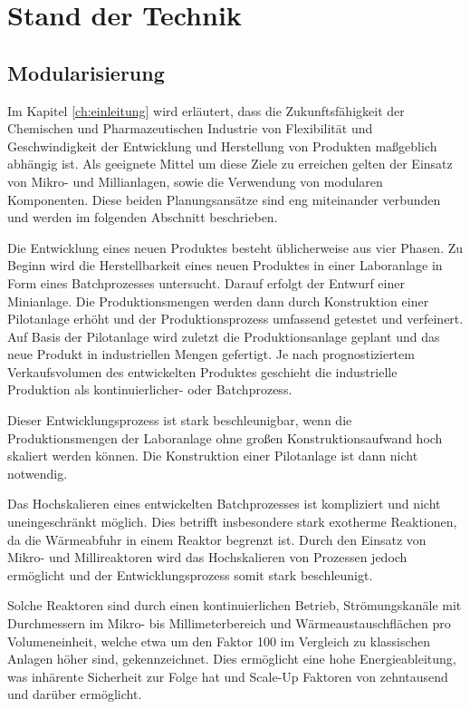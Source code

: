 \chapter{Stand der Technik} \label{ch:sdt}
\section{Modularisierung}
Im Kapitel \ref{ch:einleitung} wird erl\"autert, dass die Zukunftsf\"ahigkeit der Chemischen und Pharmazeutischen Industrie von Flexibilit\"at und Geschwindigkeit der Entwicklung und Herstellung von Produkten ma\ss{}geblich abh\"angig ist. Als geeignete Mittel um diese Ziele zu erreichen gelten der Einsatz von Mikro- und Millianlagen, sowie die Verwendung von modularen Komponenten. Diese beiden Planungsans\"atze sind eng miteinander verbunden und werden im folgenden Abschnitt beschrieben.  


Die Entwicklung eines neuen Produktes besteht \"ublicherweise aus vier Phasen. Zu Beginn wird die Herstellbarkeit eines neuen Produktes in einer Laboranlage in Form eines Batchprozesses untersucht. Darauf erfolgt der Entwurf einer Minianlage. Die Produktionsmengen werden dann durch Konstruktion einer Pilotanlage erh\"oht und der Produktionsprozess umfassend getestet und verfeinert. Auf Basis der Pilotanlage wird zuletzt die Produktionsanlage geplant und das neue Produkt in industriellen Mengen gefertigt. Je nach prognostiziertem Verkaufsvolumen des entwickelten Produktes geschieht die industrielle Produktion als kontinuierlicher- oder Batchprozess. \cite{Grundemann_2012}

Dieser  Entwicklungsprozess ist stark beschleunigbar, wenn die Produktionsmengen der Laboranlage ohne gro\ss{}en Konstruktionsaufwand hoch skaliert werden k\"onnen. Die Konstruktion einer Pilotanlage ist dann nicht notwendig.

Das Hochskalieren eines entwickelten Batchprozesses ist kompliziert und nicht uneingeschr\"ankt m\"oglich. Dies betrifft insbesondere stark exotherme Reaktionen, da die W\"armeabfuhr in einem Reaktor begrenzt ist. \cite{Brodhagen_2012} \linebreak
Durch den Einsatz von Mikro- und Millireaktoren wird das Hochskalieren von Prozessen jedoch erm\"oglicht und der Entwicklungsprozess somit stark beschleunigt. \cite{Grundemann_2012, Brodhagen_2012, Helling_2012, Kockmann_2012, Hessel_2012}

Solche Reaktoren sind durch einen kontinuierlichen Betrieb, Str\"omungskan\"ale mit Durchmessern im Mikro- bis Millimeterbereich und W\"armeaustauschfl\"achen pro Volumeneinheit, welche etwa um den Faktor 100 im Vergleich zu klassischen Anlagen h\"oher sind, gekennzeichnet. Dies erm\"oglicht eine hohe Energieableitung, was inh\"arente Sicherheit zur Folge hat und Scale-Up Faktoren von zehntausend und dar\"uber erm\"oglicht. \cite{Brodhagen_2012, Kockmann_2012a,Behr_2012}

